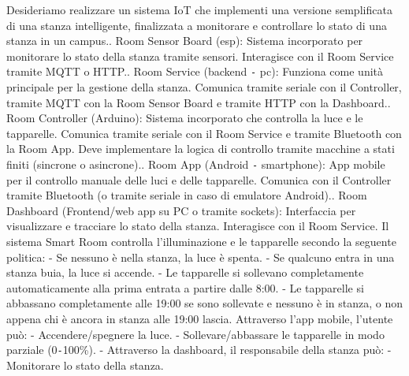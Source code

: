 \documentclass[12pt]{article}
\def\code#1{\texttt{#1}}
\begin{document}
Desideriamo realizzare un sistema IoT che implementi una versione semplificata di una stanza intelligente, finalizzata a monitorare e controllare lo stato di una stanza in un campus.. Room Sensor Board (esp): Sistema incorporato per monitorare lo stato della stanza tramite sensori. Interagisce con il Room Service tramite MQTT o HTTP.. Room Service (backend \code{-} pc): Funziona come unità principale per la gestione della stanza. Comunica tramite seriale con il Controller, tramite MQTT con la Room Sensor Board e tramite HTTP con la Dashboard.. Room Controller (Arduino): Sistema incorporato che controlla la luce e le tapparelle. Comunica tramite seriale con il Room Service e tramite Bluetooth con la Room App. Deve implementare la logica di controllo tramite macchine a stati finiti (sincrone o asincrone).. Room App (Android \code{-} smartphone): App mobile per il controllo manuale delle luci e delle tapparelle. Comunica con il Controller tramite Bluetooth (o tramite seriale in caso di emulatore Android).. Room Dashboard (Frontend/web app su PC o tramite sockets): Interfaccia per visualizzare e tracciare lo stato della stanza. Interagisce con il Room Service.\newline
Il sistema Smart Room controlla l'illuminazione e le tapparelle secondo la seguente politica:\newline
- Se nessuno è nella stanza, la luce è spenta.\newline
- Se qualcuno entra in una stanza buia, la luce si accende.\newline
- Le tapparelle si sollevano completamente automaticamente alla prima entrata a partire dalle 8:00.\newline
- Le tapparelle si abbassano completamente alle 19:00 se sono sollevate e nessuno è in stanza, o non appena chi è ancora in stanza alle 19:00 lascia.\newline
Attraverso l'app mobile, l'utente può:\newline
- Accendere/spegnere la luce.\newline
- Sollevare/abbassare le tapparelle in modo parziale (0\code{-}100\%).\newline
- Attraverso la dashboard, il responsabile della stanza può:\newline
- Monitorare lo stato della stanza.\newline
\end{document}
